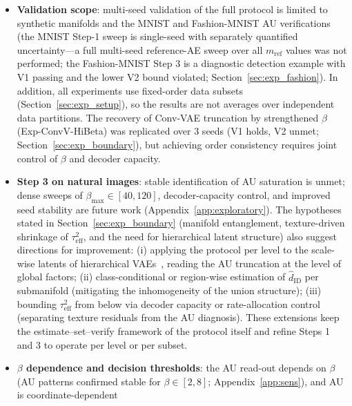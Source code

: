 \documentclass[make,article,submit,pdftex,moreauthors]{Definitions/mdpi}
\newcommand{\hatdID}{\hat{d}_{\mathrm{ID}}}
\begin{document}
\begin{itemize}
  \item \textbf{Validation scope}: multi-seed validation of the full
        protocol is limited to synthetic manifolds and the MNIST and
        Fashion-MNIST AU verifications (the MNIST Step-1 sweep is
        single-seed with separately quantified uncertainty---a full
        multi-seed reference-AE sweep over all $m_{\mathrm{ref}}$ values
        was not performed; the Fashion-MNIST Step 3 is a diagnostic
        detection example with V1 passing and the lower V2 bound violated;
        Section~\ref{sec:exp_fashion}).
        In addition, all experiments use fixed-order data subsets
        (Section~\ref{sec:exp_setup}), so the results are not averages
        over independent data partitions.
        The recovery of Conv-VAE truncation by strengthened $\beta$
        (Exp-ConvV-HiBeta) was replicated over 3 seeds (V1 holds, V2
        unmet; Section~\ref{sec:exp_boundary}), but achieving order
        consistency requires joint control of $\beta$ and decoder
        capacity.
  \item \textbf{Step 3 on natural images}: stable identification of AU
        saturation is unmet; dense sweeps of
        $\beta_{\max} \in [40, 120]$, decoder-capacity control, and improved
        seed stability are future work (Appendix~\ref{app:exploratory}).
        The hypotheses stated in Section~\ref{sec:exp_boundary} (manifold
        entanglement, texture-driven shrinkage of $\tau^2_{\mathrm{eff}}$,
        and the need for hierarchical latent structure) also suggest
        directions for improvement:
        (i) applying the protocol per level to the scale-wise latents of
        hierarchical VAEs~\cite{sonderby2016ladder}, reading the AU
        truncation at the level of global factors;
        (ii) class-conditional or region-wise estimation of $\hatdID$ per
        submanifold (mitigating the inhomogeneity of the union structure);
        (iii) bounding $\tau^2_{\mathrm{eff}}$ from below via decoder
        capacity or rate-allocation control (separating texture residuals
        from the AU diagnosis).
        These extensions keep the estimate--set--verify framework of the
        protocol itself and refine Steps 1 and 3 to operate per level or
        per subset.
  \item \textbf{$\beta$ dependence and decision thresholds}: the AU
        read-out depends on $\beta$
        (AU patterns confirmed stable for $\beta \in [2, 8]$;
        Appendix~\ref{app:sens}), and AU is coordinate-dependent

\end{itemize}
\end{document}
